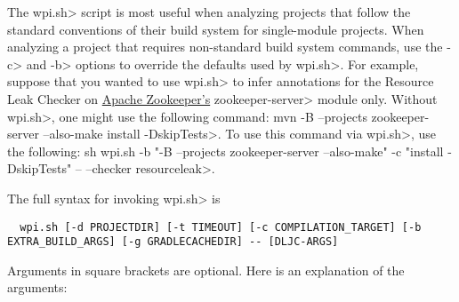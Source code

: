 The \<wpi.sh> script is most useful when analyzing projects that follow the standard
conventions of their build system for single-module projects. When analyzing a project
that requires non-standard build system commands, use the \<-c> and \<-b> options to
override the defaults used by \<wpi.sh>. For example, suppose that you wanted to use
\<wpi.sh> to infer annotations for the Resource Leak Checker on
\href{https://github.com/apache/zookeeper}{Apache Zookeeper's}
\<zookeeper-server> module only. Without \<wpi.sh>, one might use the following command:
\<mvn -B --projects zookeeper-server --also-make install -DskipTests>. To use this command via
\<wpi.sh>, use the following:
\<sh wpi.sh -b "-B --projects zookeeper-server --also-make" -c "install -DskipTests" -- --checker resourceleak>.

The full syntax for invoking \<wpi.sh> is

\begin{Verbatim}
  wpi.sh [-d PROJECTDIR] [-t TIMEOUT] [-c COMPILATION_TARGET] [-b EXTRA_BUILD_ARGS] [-g GRADLECACHEDIR] -- [DLJC-ARGS]
\end{Verbatim}

Arguments in square brackets are optional.
Here is an explanation of the arguments:

